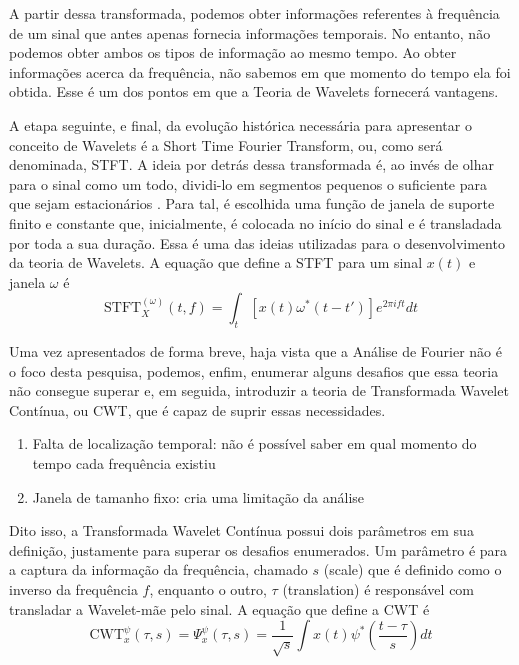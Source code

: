 \documentclass[12pt]{article}
\begin{document}
	A partir dessa transformada, podemos obter informações referentes à frequência de um sinal que antes apenas fornecia informações temporais. No entanto, não podemos obter ambos os tipos de informação ao mesmo tempo. Ao obter informações acerca da frequência, não sabemos em que momento do tempo ela foi obtida. Esse é um dos pontos em que a Teoria de \textrm{Wavelets} fornecerá vantagens.
	
	A etapa seguinte, e final, da evolução histórica necessária para apresentar o conceito de \textrm{Wavelets} é a \textrm{Short Time Fourier Transform}, ou, como será denominada, \textrm{STFT}. A ideia por detrás dessa transformada é, ao invés de olhar para o sinal como um todo, dividi-lo em segmentos pequenos o suficiente para que sejam estacionários \cite{WaveTutorial}. Para tal, é escolhida uma \textrm{função de janela} de suporte finito e constante que, inicialmente, é colocada no início do sinal e é transladada por toda a sua duração. Essa é uma das ideias utilizadas para o desenvolvimento da teoria de \textrm{Wavelets}. A equação que define a \textrm{STFT} para um sinal $x(t)$ e janela $\omega$ é
	\begin{equation*}
		\textrm{STFT}^{(\omega)}_X(t,f)=\int_{t}[x(t)\omega^{*}(t-t')]e^{2\pi if t}dt
	\end{equation*}

	Uma vez apresentados de forma breve, haja vista que a Análise de Fourier não é o foco desta pesquisa, podemos, enfim, enumerar alguns desafios que essa teoria não consegue superar e, em seguida, introduzir a teoria de Transformada \textrm{Wavelet} Contínua, ou \textrm{CWT}, que é capaz de suprir essas necessidades.
	
	\begin{enumerate}
		\item Falta de localização temporal: não é possível saber em qual momento do tempo cada frequência existiu
		\item Janela de tamanho fixo: cria uma limitação da análise 
	\end{enumerate}

	Dito isso, a Transformada \textrm{Wavelet} Contínua possui dois parâmetros em sua definição, justamente para superar os desafios enumerados. Um parâmetro é para a captura da informação da frequência, chamado $s$ \textrm{(scale)} que é definido como o inverso da frequência $f$, enquanto o outro, $\tau$ \textrm{(translation)} é responsável com transladar a \textrm{Wavelet}-mãe pelo sinal. A equação que define a \textrm{CWT} é
	\begin{equation}\label{eq:CWT}
		\textrm{CWT}^{\psi}_{x}(\tau,s)=\Psi^{\psi}_x(\tau,s)=\dfrac{1}{\sqrt{s}}\int x(t)\psi^{*}(\dfrac{t-\tau}{s})dt
	\end{equation}
\end{document}

